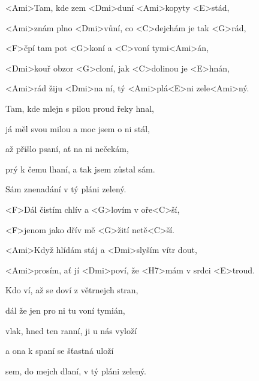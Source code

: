 

\zs
<Ami>Tam, kde zem <Dmi>duní <Ami>kopyty <E>stád,

<Ami>znám plno <Dmi>vůní, co <C>dejchám je tak <G>rád,

<F>čpí tam pot <G>koní a <C>voní tymi<Ami>án,

<Dmi>kouř obzor <G>cloní, jak <C>dolinou je <E>hnán,

<Ami>rád žiju <Dmi>na ní, tý <Ami>plá<E>ni zele<Ami>ný.
\ks

\zs
Tam, kde mlejn s pilou proud řeky hnal,

já měl svou milou a moc jsem o ni stál,

až přišlo psaní, ať na ni nečekám,

prý k čemu lhaní, a tak jsem zůstal sám.

Sám znenadání v tý pláni zelený.
\ks

\zr
<F>Dál čistím chlív a <G>lovím v oře<C>ší,

<F>jenom jako dřív mě <G>žití netě<C>ší.

<Ami>Když hlídám stáj a <Dmi>slyším vítr dout,

<Ami>prosím, ať jí <Dmi>poví, že <H7>mám v srdci <E>troud.
\kr

\zs
Kdo ví, až se doví z větrnejch stran,

dál že jen pro ni tu voní tymián,

vlak, hned ten ranní, ji u nás vyloží

a ona k spaní se šťastná uloží

sem, do mejch dlaní, v tý pláni zelený.
\ks

\kp
